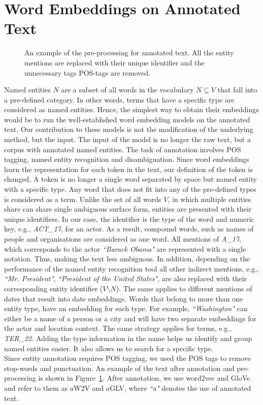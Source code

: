 \section{Word Embeddings on Annotated Text}\label{sec:annotated}
\begin{figure}
\centering 
\resizebox{0.85\textwidth}{0.28\textwidth}{      

}
\caption{An example of the pre-processing for annotated text. All the entity mentions are replaced with their unique identifier and the unnecessary tags POS-tags are removed.}
\label{fig:annotation}
\end{figure}
Named entities $N$ are a subset of all words in the vocabulary $N\subseteq V$ that fall into a pre-defined category. In other words, terms that have a specific type are considered as named entities. Hence, the simplest way to obtain their embeddings would be to run the well-established word embedding models on the annotated text. Our contribution to these models is not the modification of the underlying method, but the input. The input of the model is no longer the raw text, but a corpus with annotated named entities. The task of annotation involves POS tagging, named entity recognition and disambiguation. Since word embeddings learn the representation for each token in the text, our definition of the token is changed. A token is no longer a single word separated by space but named entity with a specific type. Any word that does not fit into any of the pre-defined types is considered as a term. Unlike the set of all words $V$, in which multiple entities share can share single ambiguous surface form, entities are presented with their unique identifiers. In our case, the identifier is the type of the word and numeric key, e.g., \emph{ACT\_17}, for an actor. As a result, compound words, such as names of people and organisations are considered as one word. All mentions of \emph{A\_17}, which corresponds to the actor \emph{``Barack Obama"} are represented with a single notation. Thus, making the text less ambiguous. In addition, depending on the performance of the named entity recognition tool all other indirect mentions, e.g., \emph{``Mr. President"}, \emph{``President of the United States"}, are also replaced with their corresponding entity identifier ($V\setminus  N$). The same applies to different mentions of dates that result into date embeddings. Words that belong to more than one entity type, have an embedding for each type. For example, \emph{``Washington"} can either be a name of a person or a city and will have two separate embeddings for the actor and location context. The same strategy applies for terms, e.g., \emph{TER\_22}. Adding the type information in the name helps us identify and group named entities easier. It also allows us to search for a specific type. \\
Since entity annotation requires POS tagging, we used the POS tags to remove stop-words and punctuation. An example of the text after annotation and pre-processing is shown in Figure~\ref{fig:annotation}. After annotation, we use word2vec and GloVe and refer to them as $a$W2V and $a$GLV, where \emph{``a"} denotes the use of annotated text. 

